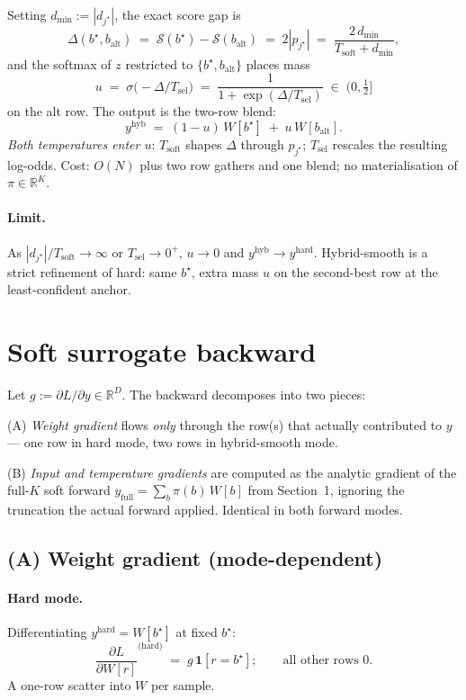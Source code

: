 \documentclass[11pt]{article}
\newcommand{\R}{\mathbb{R}}
\newcommand{\Tsel}{T_{\mathrm{sel}}}
\newcommand{\Tsoft}{T_{\mathrm{soft}}}
\newcommand{\dout}{D}
\newcommand{\bstar}{b^{\star}}
\newcommand{\jstar}{j^{\star}}
\begin{document}
\noindent Setting $d_{\min} := |d_{\jstar}|$, the exact score gap is
\[
\Delta(\bstar, b_{\text{alt}}) \;=\; \mathcal{S}(\bstar) - \mathcal{S}(b_{\text{alt}}) \;=\; 2|p_{\jstar}| \;=\; \frac{2\, d_{\min}}{\Tsoft + d_{\min}},
\]
and the softmax of $z$ restricted to $\{\bstar, b_{\text{alt}}\}$ places mass
\[
u \;=\; \sigma\!\bigl(-\Delta/\Tsel\bigr) \;=\; \frac{1}{1 + \exp(\Delta/\Tsel)} \;\in\; (0,\tfrac{1}{2}]
\]
on the alt row. The output is the two-row blend:
\[
\boxed{\;
y^{\text{hyb}} \;=\; (1-u)\, W[\bstar] \;+\; u\, W[b_{\text{alt}}].
\;}
\]
\emph{Both temperatures enter $u$}: $\Tsoft$ shapes $\Delta$ through $p_{\jstar}$; $\Tsel$ rescales the resulting log-odds. Cost: $O(N)$ plus two row gathers and one blend; no materialisation of $\pi \in \R^{K}$.

\paragraph{Limit.} As $|d_{\jstar}|/\Tsoft \to \infty$ or $\Tsel \to 0^+$, $u \to 0$ and $y^{\text{hyb}} \to y^{\text{hard}}$. Hybrid-smooth is a strict refinement of hard: same $\bstar$, extra mass $u$ on the second-best row at the least-confident anchor.

\section{Soft surrogate backward}
\label{sec:bwd}

Let $g := \partial L/\partial y \in \R^{\dout}$. The backward decomposes into two pieces:

\medskip
\noindent (A)\; \emph{Weight gradient} flows \emph{only} through the row(s) that actually contributed to $y$ — one row in hard mode, two rows in hybrid-smooth mode.

\noindent (B)\; \emph{Input and temperature gradients} are computed as the analytic gradient of the full-$K$ soft forward $y_{\text{full}} = \sum_b \pi(b)\, W[b]$ from Section~1, ignoring the truncation the actual forward applied. Identical in both forward modes.

\subsection*{(A) Weight gradient (mode-dependent)}

\paragraph{Hard mode.} Differentiating $y^{\text{hard}} = W[\bstar]$ at fixed $\bstar$:
\[
\frac{\partial L}{\partial W[r]}^{\text{(hard)}} \;=\; g\,\mathbf{1}[r = \bstar];
\qquad \text{all other rows } 0.
\]
A one-row scatter into $W$ per sample.
\end{document}

